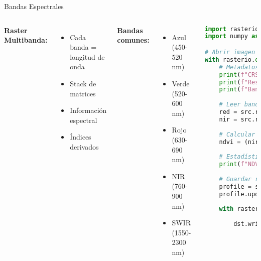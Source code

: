 \documentclass[10pt]{beamer}
\begin{document}
\begin{frame}[fragile]{Bandas Espectrales}
    \begin{columns}
        \textbf{Raster Multibanda:}
        \begin{itemize}
            \item Cada banda = longitud de onda
            \item Stack de matrices
            \item Información espectral
            \item Índices derivados
        \end{itemize}
        
        \vspace{0.3cm}
        \textbf{Bandas comunes:}
        \begin{itemize}
            \item Azul (450-520 nm)
            \item Verde (520-600 nm)
            \item Rojo (630-690 nm)
            \item NIR (760-900 nm)
            \item SWIR (1550-2300 nm)
        \end{itemize}
        
        \begin{lstlisting}[language=Python, caption=Trabajo con rasters]
import rasterio
import numpy as np

# Abrir imagen multiespectral
with rasterio.open('sentinel2.tif') as src:
    # Metadatos
    print(f"CRS: {src.crs}")
    print(f"Res: {src.res}")
    print(f"Bandas: {src.count}")
    
    # Leer bandas
    red = src.read(4)   # B4
    nir = src.read(8)   # B8
    
    # Calcular NDVI
    ndvi = (nir - red) / (nir + red + 0.0001)
    
    # Estadísticas
    print(f"NDVI medio: {ndvi.mean():.3f}")
    
    # Guardar resultado
    profile = src.profile
    profile.update(count=1, dtype='float32')
    
    with rasterio.open('ndvi.tif', 'w', 
                       **profile) as dst:
        dst.write(ndvi, 1)
        \end{lstlisting}
    \end{columns}
\end{frame}
\end{document}
